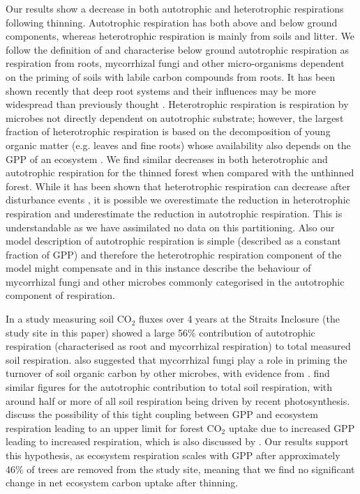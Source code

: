 Our results show a decrease in both autotrophic and heterotrophic respirations following thinning. Autotrophic respiration has both above and below ground components, whereas heterotrophic respiration is mainly from soils and litter. We follow the definition of \citet{heinemeyer2012exploring} and characterise below ground autotrophic respiration as respiration from roots, mycorrhizal fungi and other micro-organisms dependent on the priming of soils with labile carbon compounds from roots. It has been shown recently that deep root systems and their influences may be more widespread than previously thought \citep{Pierret01102016}. Heterotrophic respiration is respiration by microbes not directly dependent on autotrophic substrate; however, the largest fraction of heterotrophic respiration is based on the decomposition of young organic matter (e.g. leaves and fine roots) whose availability also depends on the GPP of an ecosystem \citep{GCB:GCB412}. We find similar decreases in both heterotrophic and autotrophic respiration for the thinned forest when compared with the unthinned forest. While it has been shown that heterotrophic respiration can decrease after disturbance events \citep{PCE:PCE1053}, it is possible we overestimate the reduction in heterotrophic respiration and underestimate the reduction in autotrophic respiration. This is understandable as we have assimilated no data on this partitioning. Also our model description of autotrophic respiration is simple (described as a constant fraction of GPP) and therefore the heterotrophic respiration component of the model might compensate and in this instance describe the behaviour of mycorrhizal fungi and other microbes commonly categorised in the autotrophic component of respiration.   

In a study measuring soil CO\(_{2}\) fluxes over 4 years at the Straits Inclosure (the study site in this paper) \citet{heinemeyer2012exploring} showed a large 56\% contribution of autotrophic respiration (characterised as root and mycorrhizal respiration) to total measured soil respiration. \citet{heinemeyer2012exploring} also suggested that mycorrhizal fungi play a role in priming the turnover of soil organic carbon by other microbes, with evidence from \citet{talbot2008decomposers}. \citet{hogberg2006towards} find similar figures for the autotrophic contribution to total soil respiration, with around half or more of all soil respiration being driven by recent photosynthesis. \citet{heinemeyer2012exploring} discuss the possibility of this tight coupling between GPP and ecosystem respiration leading to an upper limit for forest CO\(_{2}\) uptake due to increased GPP leading to increased respiration, which is also discussed by \citet{heath2005rising}. Our results support this hypothesis, as ecosystem respiration scales with GPP after approximately 46\% of trees are removed from the study site, meaning that we find no significant change in net ecosystem carbon uptake after thinning.   

